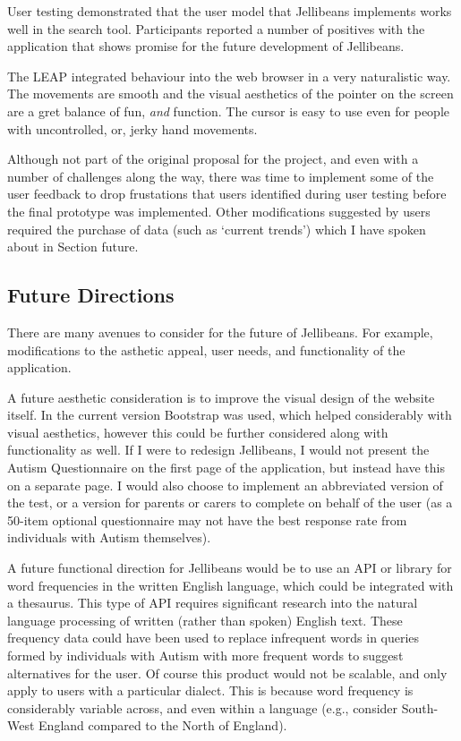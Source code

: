 \documentclass[a4paper, 11pt]{article}
\begin{document}
\vspace{5mm}
User testing demonstrated that the user model that Jellibeans implements works well in the search tool. Participants reported a number of positives with the application that shows promise for the future development of Jellibeans.

\vspace{5mm}
The LEAP integrated behaviour into the web browser in a very naturalistic way. The movements are smooth and the visual aesthetics of the pointer on the screen are a gret balance of fun, \textit{and} function. The cursor is easy to use even for people with uncontrolled, or, jerky hand movements. 

\vspace{5mm}
Although not part of the original proposal for the project, and even with a number of challenges along the way, there was time to implement some of the user feedback to drop frustations that users identified during user testing before the final prototype was implemented. Other modifications suggested by users required the purchase of data (such as `current trends') which I have spoken about in Section {future}.

\subsection{Future Directions}\label{future}
There are many avenues to consider for the future of Jellibeans. For example, modifications to the asthetic appeal, user needs, and functionality of the application.

\vspace{5mm}
A future aesthetic consideration is to improve the visual design of the website itself. In the current version Bootstrap was used, which helped considerably with visual aesthetics, however this could be further considered along with functionality as well. If I were to redesign Jellibeans, I would not present the Autism Questionnaire on the first page of the application, but instead have this on a separate page. I would also choose to implement an abbreviated version of the test, or a version for parents or carers to complete on behalf of the user (as a 50-item optional questionnaire may not have the best response rate from individuals with Autism themselves).

\vspace{5mm}
A future functional direction for Jellibeans would be to use an API or library for word frequencies in the written English language, which could be integrated with a thesaurus. This type of API requires significant research into the natural language processing of written (rather than spoken) English text. These frequency data could have been used to replace infrequent words in queries formed by individuals with Autism with more frequent words to suggest alternatives for the user. Of course this product would not be scalable, and only apply to users with a particular dialect. This is because word frequency is considerably variable across, and even within a language (e.g., consider South-West England compared to the North of England).
\end{document}
